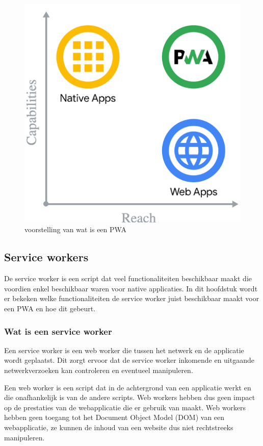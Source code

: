 \begin{figure}[!htb]
	\centering
	\includegraphics{./img/WatIsEenPwa.png}
	\caption{voorstelling van wat is een PWA \autocite{Richard2020}}
\end{figure}


\subsection{Service workers}

	De service worker is een script dat veel functionaliteiten beschikbaar maakt die voordien enkel beschikbaar waren voor native applicaties. In dit hoofdstuk wordt er bekeken welke functionaliteiten de service worker juist beschikbaar maakt voor een PWA en hoe dit gebeurt. 
	
	
	
	\subsubsection{Wat is een service worker}
	
		Een service worker is een web worker die tussen het netwerk en de applicatie wordt geplaatst. Dit zorgt ervoor dat de service worker inkomende en uitgaande netwerkverzoeken kan controleren en eventueel manipuleren.
		\autocite{Mozilla2020}
		
		Een web worker is een script dat in de achtergrond van een applicatie werkt en die onafhankelijk is van de andere scripts. Web workers hebben dus geen impact op de prestaties van de webapplicatie die er gebruik van maakt.  Web workers hebben geen toegang tot het Document Object Model (DOM) van een webapplicatie, ze kunnen de inhoud van een website dus niet rechtstreeks manipuleren.
		
